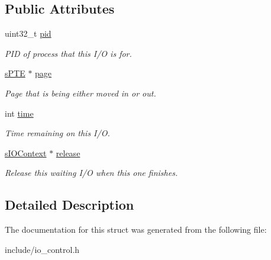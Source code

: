 \subsection*{\-Public \-Attributes}
\begin{DoxyCompactItemize}
\item 
\hypertarget{structsIOContext_a59c80b76f45173eb0aa17c873f962910}{uint32\-\_\-t \hyperlink{structsIOContext_a59c80b76f45173eb0aa17c873f962910}{pid}}\label{de/d05/structsIOContext_a59c80b76f45173eb0aa17c873f962910}

\begin{DoxyCompactList}\small\item\em \-P\-I\-D of process that this \-I/\-O is for. \end{DoxyCompactList}\item 
\hypertarget{structsIOContext_af810e0e396ab38bc4388c250be40842e}{\hyperlink{structsPTE}{s\-P\-T\-E} $\ast$ \hyperlink{structsIOContext_af810e0e396ab38bc4388c250be40842e}{page}}\label{de/d05/structsIOContext_af810e0e396ab38bc4388c250be40842e}

\begin{DoxyCompactList}\small\item\em \-Page that is being either moved in or out. \end{DoxyCompactList}\item 
\hypertarget{structsIOContext_a71797bca2d785faa773940c5e16f84ed}{int \hyperlink{structsIOContext_a71797bca2d785faa773940c5e16f84ed}{time}}\label{de/d05/structsIOContext_a71797bca2d785faa773940c5e16f84ed}

\begin{DoxyCompactList}\small\item\em \-Time remaining on this \-I/\-O. \end{DoxyCompactList}\item 
\hypertarget{structsIOContext_ab832d28a1251bc233e5e5cf682622c08}{\hyperlink{structsIOContext}{s\-I\-O\-Context} $\ast$ \hyperlink{structsIOContext_ab832d28a1251bc233e5e5cf682622c08}{release}}\label{de/d05/structsIOContext_ab832d28a1251bc233e5e5cf682622c08}

\begin{DoxyCompactList}\small\item\em \-Release this waiting \-I/\-O when this one finishes. \end{DoxyCompactList}\end{DoxyCompactItemize}


\subsection{\-Detailed \-Description}


\-The documentation for this struct was generated from the following file\-:\begin{DoxyCompactItemize}
\item 
include/io\-\_\-control.\-h\end{DoxyCompactItemize}
